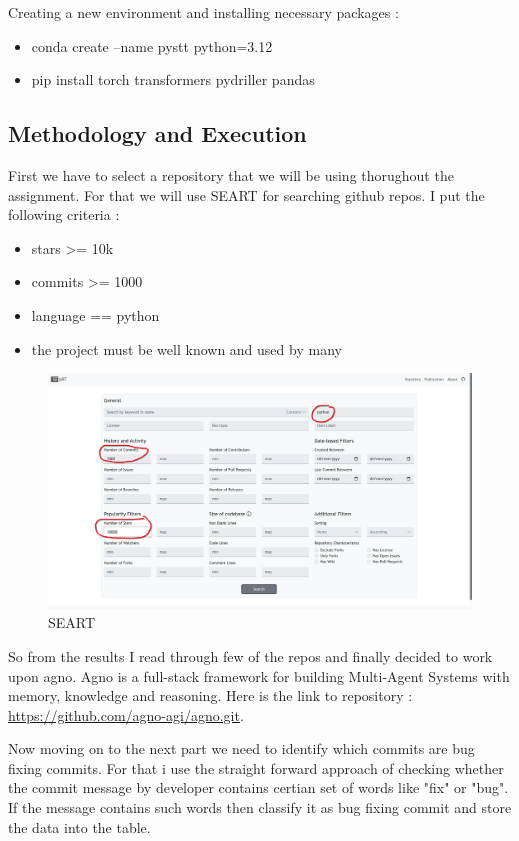 \documentclass[a4paper,12pt,twoside,english]{all-in-one} %
\begin{document}
Creating a new environment and installing necessary packages :
\begin{itemize}
    \item conda create --name pystt python=3.12
    \item pip install torch transformers pydriller pandas 
\end{itemize}

\subsection{Methodology and Execution}

First we have to select a repository that we will be using thorughout the assignment. For that we will use SEART for searching github repos. I put the following criteria :
\begin{itemize}
    \item stars >= 10k
    \item commits >= 1000
    \item language == python
    \item the project must be well known and used by many
\end{itemize}

\begin{figure}[H]
    \centering
    \includegraphics[width=0.75\linewidth]{image18.png}
    \caption{SEART}
    \label{fig:placeholder}
\end{figure}

So from the results I read through few of the repos and finally decided to work upon agno. Agno is a full-stack framework for building Multi-Agent Systems with memory, knowledge and reasoning. Here is the link to repository : \href{link}{https://github.com/agno-agi/agno.git}. 

Now moving on to the next part we need to identify which commits are bug fixing commits. For that i use the straight forward approach of checking whether the commit message by developer contains certian set of words like "fix" or "bug". If the message contains such words then classify it as bug fixing commit and store the data into the table.
\end{document}
